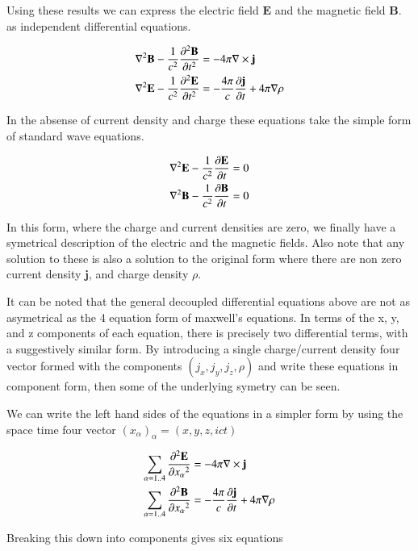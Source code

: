 \documentclass{article}      %
\newcommand{\grad}[1]{\nabla#1}
\newcommand{\Curl}[1]{\nabla \times \mathbf{#1}}
\newcommand{\Delsquared}[1]{{\nabla^2}{\mathbf{#1}}}
\newcommand{\Ddt}[1]{ {{\partial{\mathbf{#1}}} \over {\partial{t}}}}
\newcommand{\Ddts}[1]{ {{\partial^2{\mathbf{#1}}} \over {\partial{t}^2}}}
\newcommand{\Dds}[2]{ {{\partial^2{\mathbf{#1}}} \over {\partial{#2}^2}}}
\newcommand{\Bj}[0]{\mathbf{j}}
\newcommand{\BB}[0]{\mathbf{B}}
\newcommand{\BE}[0]{\mathbf{E}}
\begin{document}
Using these results we can express the 
electric field $\BE$ and the
magnetic field $\BB$.
as independent differential equations.

\begin{align*}
\Delsquared{B} - {1 \over c^2} \Ddts{B} &= - 4\pi \Curl{j} \\
\Delsquared{E} - {1 \over c^2} \Ddts{E} &= - {4\pi \over c} \Ddt{j} + 4\pi \grad{\rho}
\end{align*}

In the absense of current density and charge these equations take the simple form of standard wave
equations.

\begin{align*}
\Delsquared{E} - {1 \over c^2} \Ddt{E} &= 0 \\
\Delsquared{B} - {1 \over c^2} \Ddt{B} &= 0
\end{align*}

In this form, where the charge and current densities are zero, we finally have 
a symetrical description of the electric and the magnetic fields.  Also note 
that any solution to these is also a solution to the original form where 
there are non zero current density $\Bj$, and charge density $\rho$.

It can 
be noted that the general decoupled differential equations above are not 
as asymetrical as the 4 equation form of maxwell's equations.  In terms of the x, y, and z components 
of each equation, there is precisely two differential terms, with a suggestively 
similar form.
By introducing a 
single charge/current density four vector formed with the components 
$(j_x, j_y, j_z, \rho)$ and write these equations in component 
form, 
then some of the underlying symetry can be seen.

We 
can write the left hand sides of the equations in a simpler form by using the 
space time four vector $(x_\alpha)_\alpha = (x, y, z, ict)$

\begin{align*}
\sum_{\alpha = 1 .. 4}{\Dds{E} {x_\alpha}} &= - 4\pi \Curl{j} \\
\sum_{\alpha = 1 .. 4}{\Dds{B} {x_\alpha}} &= - {4\pi \over c} \Ddt{j} + 4\pi \grad{\rho}
\end{align*}

Breaking this down into components gives six equations

\end{document}
